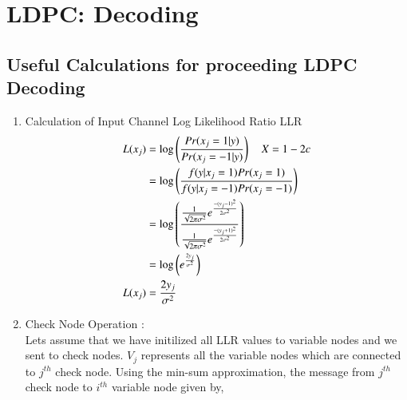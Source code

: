 \documentclass[journal,12pt,twocolumn]{IEEEtran}
\begin{document}
\section{LDPC: Decoding}
\subsection{Useful Calculations for proceeding LDPC Decoding }
\begin{enumerate}
\item Calculation of Input Channel Log Likelihood Ratio LLR 
\begin{align}
L(x_j)&=\log \left(\frac{Pr(x_j=1|y)}{Pr(x_j=-1|y)}\right) \quad X=1-2c\\
&= \log \left(\frac{f(y|x_j=1)Pr(x_j=1)}{f(y|x_j=-1)Pr(x_j=-1)}\right) \\
&= \log \left(\frac{\frac{1}{\sqrt{2\pi\sigma^2}}e^{\frac{-(y_j-1)^2}{2\sigma^2}}}{\frac{1}{\sqrt{2\pi\sigma^2}}e ^{\frac{-(y_j+1)^2}{2\sigma^2}}} \right) \\
&=\log \left(e^{\frac{2y_j}{\sigma^2}}\right) \\
L(x_j)&= \frac{2y_j}{\sigma^2} \label{eq :li}
\end{align}
\item Check Node Operation : \\
Lets assume that we have initilized all LLR values to variable nodes and we sent to check nodes. ${V_j}$ represents all the variable nodes which are connected to $j^{th}$ check node. Using the min-sum approximation\cite{minsum}, the message from  $j^{th}$ check node to  $i^{th}$ variable node given by,
\begin{figure}[!ht]
\begin{center}
%
%
%
%
%
%
%
%
%
%
%
%
%

\end{center}
\end{figure}
\end{enumerate}
\end{document}
